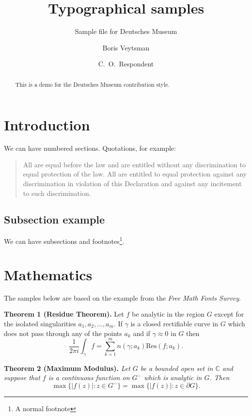 \documentclass[nocfonts,fleqn,folios]{deutschesmuseum}
\begin{document}
\title{Typographical samples}
\subtitle{Sample file for Deutsches Museum}
\author{Boris Veytsman \and C.~O.~Respondent}
\maketitle

\begin{abstract}
  This is a demo for the Deutsches Museum contribution style.
\end{abstract}

\section{Introduction}
\label{sec:intro}

We can have numbered sections.  Quotations, for
example\cite[][Article~7]{UNDeclaration}: 
\begin{quote}
  All are equal before the law and are entitled without any
  discrimination to equal protection of the law. All are entitled to
  equal protection against any discrimination in violation of this
  Declaration and against any incitement to such discrimination. 
\end{quote}

\subsection{Subsection example}
\label{sec:subsection}

We can have subsections and footnotes\footnote{A normal footnote}.

\section{Mathematics}
\label{sec:math}

The samples below are based on the example from the \emph{Free Math
  Fonts Survey}\cite{Hartke06,
  free-math-font-survey}.


\textbf{Theorem 1 (Residue Theorem).}
Let $f$ be analytic in the region $G$ except for the isolated singularities $a_1,a_2,\ldots,a_m$. If $\gamma$ is a closed rectifiable curve in $G$ which does not pass through any of the points $a_k$ and if $\gamma\approx 0$ in $G$ then
\[
\frac{1}{2\pi i}\int_\gamma f = \sum_{k=1}^m n(\gamma;a_k) \text{Res}(f;a_k).
\]

\textbf{Theorem 2 (Maximum Modulus).}
\emph{Let $G$ be a bounded open set in $\mathbb{C}$ and suppose that $f$ is a continuous function on $G^-$ which is analytic in $G$. Then}
\[
\max\{|f(z)|:z\in G^-\}=\max \{|f(z)|:z\in \partial G \}.
\]
\end{document}
